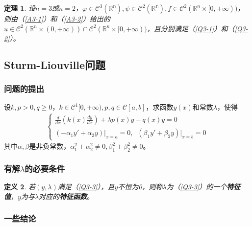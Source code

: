 \documentclass[11pt, a4paper]{article}
\theoremstyle{theorem}
\newtheorem{thm}{定理}[section]
\newtheorem{definition}[thm]{定义}
\begin{document}
\begin{thm}
设$n=3$或$n=2$，$\varphi \in \mathcal{C}^3(\mathbb{R^n}),\psi \in \mathcal{C}^2(\mathbb{R^n}), f \in \mathcal{C}^2(\mathbb{R}^n \times [0,+\infty))$，则由（\ref{A3-1}）和（\ref{A3-2}）给出的$u \in \mathcal{C}^2(\mathbb{R}^n \times (0,+\infty)) \cap \mathcal{C}^2(\mathbb{R}^n \times [0,+\infty))$，且分别满足（\ref{Q3-1}）和（\ref{Q3-2}）。
\end{thm}

\subsection{Sturm-Liouville问题}

\subsubsection{问题的提出}

设$k,p > 0, q \geq 0$，$k \in \mathcal{C}^1[0, +\infty), p,q \in \mathcal{C}[a,b]$，求函数$y(x)$和常数$\lambda$，使得
\begin{align}
\label{Q3-3}
    \begin{cases}
    \frac{d}{d x} \left(k(x) \frac{d y}{d x}\right) + \lambda p(x) y - q(x) y = 0 \\
    \left(-\alpha_1 y' + \alpha_2y \right) \bigg|_{x=a} = 0, \; \; \left(\beta_1 y' + \beta_2 y \right) \bigg|_{x=b} = 0
    \end{cases}
\end{align}
其中$\alpha, \beta$是非负常数，$\alpha_1^2 + \alpha_2^2 \neq 0,\beta_1^2 + \beta_2^2 \neq 0$。\\

\subsubsection{有解$\lambda$的必要条件}

\begin{definition}
若$(y,\lambda)$满足（\ref{Q3-3}），且$y$不恒为0，则称$\lambda$为（\ref{Q3-3}）的一个\textbf{特征值}，$y$为与$\lambda$对应的\textbf{特征函数}。
\end{definition}

\subsubsection{一些结论}
\end{document}
